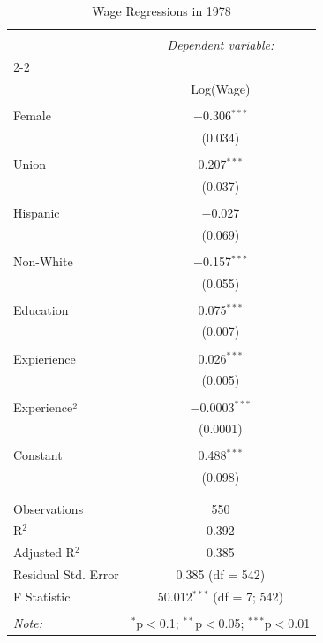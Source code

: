 
\begin{table}[!htbp] \centering 
  \caption{Wage Regressions
          in 1978} 
  \label{} 
\begin{tabular}{@{\extracolsep{5pt}}lc} 
\\[-1.8ex]\hline 
\hline \\[-1.8ex] 
 & \multicolumn{1}{c}{\textit{Dependent variable:}} \\ 
\cline{2-2} 
\\[-1.8ex] & Log(Wage) \\ 
\hline \\[-1.8ex] 
 Female & $-$0.306$^{***}$ \\ 
  & (0.034) \\ 
  & \\ 
 Union & 0.207$^{***}$ \\ 
  & (0.037) \\ 
  & \\ 
 Hispanic & $-$0.027 \\ 
  & (0.069) \\ 
  & \\ 
 Non-White & $-$0.157$^{***}$ \\ 
  & (0.055) \\ 
  & \\ 
 Education & 0.075$^{***}$ \\ 
  & (0.007) \\ 
  & \\ 
 Expierience & 0.026$^{***}$ \\ 
  & (0.005) \\ 
  & \\ 
 Experience² & $-$0.0003$^{***}$ \\ 
  & (0.0001) \\ 
  & \\ 
 Constant & 0.488$^{***}$ \\ 
  & (0.098) \\ 
  & \\ 
\hline \\[-1.8ex] 
Observations & 550 \\ 
R$^{2}$ & 0.392 \\ 
Adjusted R$^{2}$ & 0.385 \\ 
Residual Std. Error & 0.385 (df = 542) \\ 
F Statistic & 50.012$^{***}$ (df = 7; 542) \\ 
\hline 
\hline \\[-1.8ex] 
\textit{Note:}  & \multicolumn{1}{r}{$^{*}$p$<$0.1; $^{**}$p$<$0.05; $^{***}$p$<$0.01} \\ 
\end{tabular} 
\end{table} 
